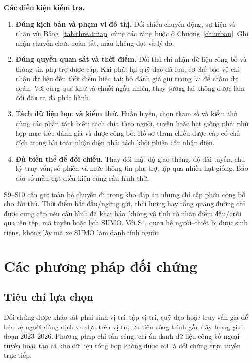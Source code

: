 \documentclass[12pt,a4paper,oneside]{report}
\begin{document}
\noindent\textbf{Các điều kiện kiểm tra.}
\begin{enumerate}
  \item \textbf{Đúng kịch bản và phạm vi đô thị.} Đối chiếu chuyển động, sự kiện và nhãn với Bảng~\ref{tab:threatmap} cùng các ràng buộc ở Chương~\ref{ch:urban}. Ghi nhận chuyến chưa hoàn tất, mẫu không đạt và lý do.
  \item \textbf{Đúng quyền quan sát và thời điểm.} Đối thủ chỉ nhận dữ liệu công bố và thông tin phụ trợ được cấp. Khi phát lại quỹ đạo đã lưu, cơ chế bảo vệ chỉ nhận dữ liệu đến thời điểm hiện tại; bộ đánh giá giữ tương lai để chấm dự đoán. Với cùng quá khứ và chuỗi ngẫu nhiên, thay tương lai không được làm đổi đầu ra đã phát hành.
  \item \textbf{Tách dữ liệu học và kiểm thử.} Huấn luyện, chọn tham số và kiểm thử dùng các phần tách biệt; cách chia theo người, tuyến hoặc hạt giống phải phù hợp mục tiêu đánh giá và được công bố. Hồ sơ tham chiếu được cấp có chủ đích trong bài toán nhận diện phải tách khỏi phiên cần nhận diện.
  \item \textbf{Đủ biến thể để đối chiếu.} Thay đổi mật độ giao thông, độ dài tuyến, chu kỳ truy vấn, số phiên và mức thông tin phụ trợ; lặp qua nhiều hạt giống. Báo cáo số mẫu đạt điều kiện cùng cấu hình thử.
\end{enumerate}

S9--S10 cần giữ toàn bộ chuyến đi trong kho đáp án nhưng chỉ cấp phần công bố cho đối thủ. Thời điểm bắt đầu/ngừng gửi, thời lượng hay tổng quãng đường chỉ được cung cấp nếu cấu hình đã khai báo; không vô tình rò nhãn điểm đầu/cuối qua tên tệp, mã tuyến hoặc lịch SUMO. Với S4, quan hệ người--thiết bị được sinh riêng, không lấy mã xe SUMO làm danh tính người.



\chapter{Các phương pháp đối chứng}
\label{ch:comparators}

\section{Tiêu chí lựa chọn}

Đối chứng được khảo sát phải sinh vị trí, tập vị trí, quỹ đạo hoặc truy vấn giả để bảo vệ người dùng dịch vụ dựa trên vị trí; ưu tiên công trình gần đây trong giai đoạn 2023--2026. Phương pháp chỉ tấn công, chỉ ẩn danh dữ liệu công bố ngoại tuyến hoặc tạo cả kho dữ liệu tổng hợp không được coi là đối chứng trực tuyến trực tiếp.
\end{document}
